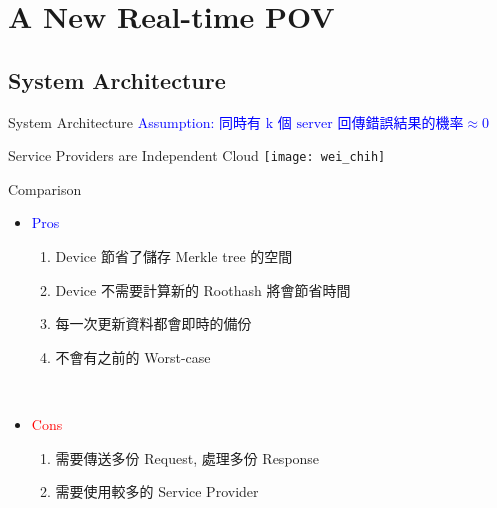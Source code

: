 \section{A New Real-time POV}

\subsection{System Architecture}
\begin{frame}{System Architecture}
	\textcolor{blue}{Assumption: $\text{同時有 k 個 server 回傳錯誤結果的機率} \approx 0$}
	\begin{center}
		\alert{Service Providers are Independent Cloud}
		\texttt{[image: wei\_chih]}
	\end{center}
\end{frame}

\begin{frame}{Comparison}
	\begin{itemize}
		\item \textcolor{blue}{Pros}
			\begin{enumerate}
				\item Device 節省了儲存 Merkle tree 的空間
                \item Device 不需要計算新的 Roothash 將會節省時間
				\item 每一次更新資料都會即時的備份
				\item 不會有之前的 Worst-case
			\end{enumerate}
		~\\
		\item \textcolor{red}{Cons}
			\begin{enumerate}
				\item 需要傳送多份 Request, 處理多份 Response
                \item 需要使用較多的 Service Provider
			\end{enumerate}
	\end{itemize}
\end{frame}

